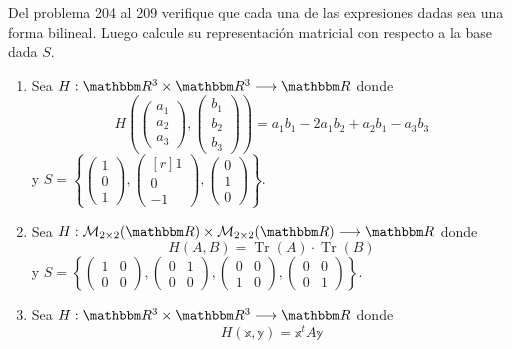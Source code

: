 Del problema 204 al 209 verifique que cada una de las expresiones dadas sea una forma bilineal. Luego calcule su representación matricial con respecto a la base dada $S$.
\begin{enumerate}[resume]
    \item Sea $H:\RR[3] \times \RR[3] \longrightarrow \RR$ donde
    $$H\left( \begin{pmatrix} a_1 \\ a_2 \\ a_3 \end{pmatrix}, \begin{pmatrix} b_1 \\ b_2 \\ b_3 \end{pmatrix} \right) = a_1b_1 - 2a_1b_2 + a_2b_1 - a_3b_3$$
    y $S = \left\{ \begin{pmatrix} 1 \\ 0 \\ 1 \end{pmatrix}, \begin{pmatrix*}[r] 1 \\ 0 \\ -1 \end{pmatrix*}, \begin{pmatrix} 0 \\ 1 \\ 0 \end{pmatrix} \right\}$.
    \item Sea $H: \mathcal{M}_{2 \times 2}(\RR) \times \mathcal{M}_{2 \times 2}(\RR) \longrightarrow \RR$ donde
    $$H(A, B) = \operatorname{Tr}(A) \cdot \operatorname{Tr}(B)$$
    y $S = \left\{ \begin{pmatrix} 1 & 0 \\ 0 & 0 \end{pmatrix}, \begin{pmatrix} 0 & 1 \\ 0 & 0 \end{pmatrix}, \begin{pmatrix} 0 & 0 \\ 1 & 0 \end{pmatrix}, \begin{pmatrix} 0 & 0 \\ 0 & 1 \end{pmatrix} \right\}$.
    \item Sea $H:\RR[3] \times \RR[3] \longrightarrow \RR$ donde
    $$H(\mathbb{x}, \mathbb{y}) = \mathbb{x}^t A\mathbb{y}$$

\end{enumerate}

